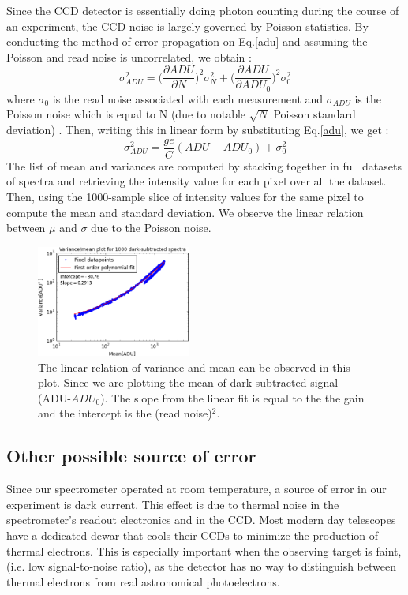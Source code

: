 \documentclass[authoryear,12pt,5p,times]{elsarticle}
\begin{document}
 
Since the CCD detector is essentially doing photon counting during the course of an experiment, the CCD noise is largely governed by Poisson statistics. By conducting the method of error propagation on Eq.\ref{adu} and assuming the Poisson and read noise is uncorrelated, we obtain :
\begin{equation}
\sigma^2_{ADU} = \Bigg(\frac{\partial ADU}{\partial N}\Bigg)^2 \sigma_N^2 +\Bigg(\frac{\partial ADU}{\partial ADU_0}\Bigg)^2\sigma_0^2
\label{error}
\end{equation}
where $\sigma_0$ is the read noise associated with each measurement and $\sigma_{ADU}$ is the   Poisson noise which is equal to N (due to notable  $\sqrt{N}$ Poisson standard deviation) . Then,  writing this in linear form by substituting Eq.\ref{adu}, we get :
\begin{equation}
\sigma^2_{ADU}=\frac{ge}{C}(ADU- ADU_0)+\sigma_0^2
\label{linear_error_relation}
\end{equation}
The list of mean and variances are computed by stacking together in full datasets  of spectra and retrieving the intensity value for each pixel over all the dataset. Then, using the 1000-sample slice of intensity values for the same pixel to compute the mean and standard deviation. We observe the linear relation between $\mu$ and $\sigma$ due to the Poisson noise. 
 \begin{figure}\includegraphics[width=0.45\textwidth]{figures/varmeanplot}
\caption{The linear relation of variance and mean can be observed in this plot. Since we are plotting the mean of dark-subtracted signal (ADU-$ADU_0$). The slope from the linear fit is equal to the the gain and the intercept is the (read noise)$^2$.} \label{varmean}
\end{figure}
\subsection{Other possible source of error}
Since our spectrometer operated at room temperature, a source of error in our experiment is dark current. This effect is due to thermal noise in the spectrometer's readout electronics and in the CCD. Most modern day telescopes have a dedicated dewar that cools their CCDs to minimize the production of thermal electrons. This is especially important when the observing target is faint, (i.e. low signal-to-noise ratio), as the detector has no way to distinguish between thermal electrons from real astronomical photoelectrons.
\end{document}
